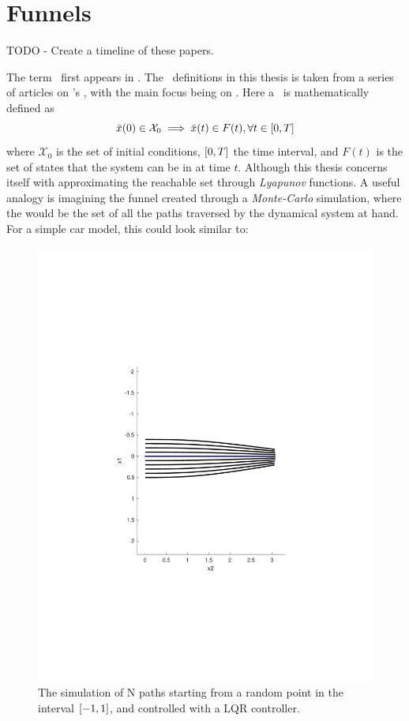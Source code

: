 \chapter{Funnels}

TODO - Create a timeline of these papers.

The term \funnel\ first appears in \cite{masonMechanicsManipulation1985}. The
\funnel\ definitions in this thesis is taken from a series of articles on
\funnel 's \cite{tobenkinInvariantFunnelsTrajectories2010}
\cite{tedrakeLQRtreesFeedbackMotion2009} \cite{majumdarRobustOnlineMotion2013}
\cite{majumdarFunnelLibrariesRealtime2017}
\cite{ahmadiDSOSSDSOSOptimization2017}, with the main focus being on
\cite{majumdarFunnelLibrariesRealtime2017}. Here a \funnel\ is mathematically
defined as
\[
  \bar{x}(0) \in \mathcal{X}_0 \implies \bar{x}(t) \in F(t), \forall t \in
  \lbrack0,T\rbrack
\]
where \(\mathcal{X}_0\) is the set of initial conditions, \(\lbrack0,T\rbrack\) the time
interval, and \(F(t)\) is the set of states that the system can be in at time
\(t\). Although this thesis concerns itself with approximating the reachable set
through \textit{Lyapunov} functions. A useful analogy is imagining the funnel
created through a \textit{Monte-Carlo} simulation, where the \funnel would be
the set of all the paths traversed by the dynamical system at hand. For a simple
car model, this could look similar to:

\begin{figure}
  \includegraphics[scale=.5]{figures/funnels/montecarlofunnel}
  \caption{The simulation of N paths starting from a random point in the
    interval \(\lbrack-1,1\rbrack\), and controlled with a LQR controller.}
\end{figure}

